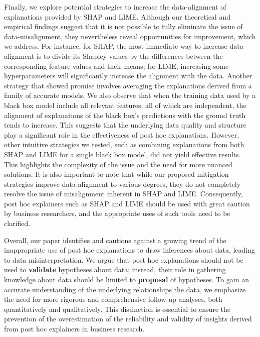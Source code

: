 \documentclass[12pt]{article}  %
\begin{document}
Finally, we explore potential strategies to increase the data-alignment of explanations provided by SHAP and LIME. Although our theoretical and empirical findings suggest that it is not possible to fully eliminate the issue of data-misalignment, they nevertheless reveal opportunities for improvement, which we address. For instance, for SHAP, the most immediate way to increase data-alignment is to divide its Shapley values by the differences between the corresponding feature values and their means; for LIME, increasing some hyperparameters will significantly increase the alignment with the data.
Another strategy that showed promise involves averaging the explanations derived from a family of accurate models. We also observe that when the training data used by a black box model include all relevant features, all of which are independent, the alignment of explanations of the black box's predictions with the ground truth tends to increase. This suggests that the underlying data quality and structure play a significant role in the effectiveness of post hoc explanations.
However, other intuitive strategies we tested, such as combining explanations from both SHAP and LIME for a single black box model, did not yield effective results. This highlights the complexity of the issue and the need for more nuanced solutions.
It is also important to note that while our proposed mitigation strategies improve data-alignment to various degrees, they do not completely resolve the issue of misalignment inherent in SHAP and LIME. Consequently, post hoc explainers such as SHAP and LIME should be used with great caution by business researchers, and the appropriate uses of such tools need to be clarified.


Overall, our paper identifies and cautions against a growing trend of the inappropriate use of post hoc explanations to draw inferences about data, leading to data misinterpretation. We argue that post hoc explanations should not be used to \textbf{validate} hypotheses about data; instead, their role in gathering knowledge about data should be limited to \textbf{proposal} of hypotheses. To gain an accurate understanding of the underlying relationships  the data, we emphasize the need for more rigorous and comprehensive follow-up analyses, both quantitatively and qualitatively. This distinction is essential to ensure the prevention of the overestimation of the reliability and validity of insights derived from post hoc explainers in business research.
\end{document}
